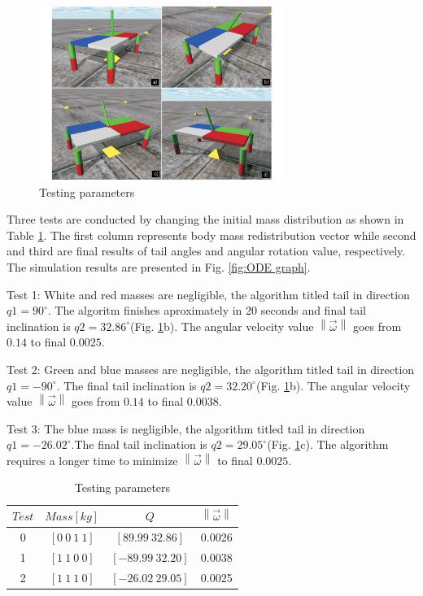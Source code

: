 \begin{figure}
	\centering
	\includegraphics[width=80mm]{./pictures/ODE_simulations.pdf}
	\caption{Testing parameters}
	\label{fig:ODESimulations}
\end{figure}

Three tests are conducted by changing the initial mass distribution as shown in Table \ref{tab:Simulations}. The first column represents body mass redistribution vector while second and third are final results of tail angles and angular rotation value, respectively. The simulation results are presented in Fig. \ref{fig:ODE graph}. 

Test 1: White and red masses are negligible, the algorithm titled tail in direction $q1=90^{\circ}$. The algoritm finishes aproximately in 20 seconds and final tail inclination is $q2=32.86^{\circ}$(Fig. \ref{fig:ODESimulations}b). The angular velocity value $\left \| \vec{\omega} \right \|$ goes from $0.14$ to final $0.0025$.

Test 2: Green and blue masses are negligible, the algorithm titled tail in direction $q1=-90^{\circ}$. The final tail inclination is $q2=32.20^{\circ}$(Fig. \ref{fig:ODESimulations}b). The angular velocity value $\left \| \vec{\omega} \right \|$ goes from $0.14$ to final $0.0038$. 

Test 3: The blue mass is negligible, the algorithm titled tail in direction $q1=-26.02^{\circ}$.The final tail inclination is $q2=29.05^{\circ}$(Fig. \ref{fig:ODESimulations}c). The algorithm requires a longer time to minimize $\left \| \vec{\omega} \right \|$ to final $0.0025$.

\begin{table}
	\centering
\begin{tabular}{|c|ccc|}
	\hline
$Test$ &  $Mass[kg]$ & $Q$  & $\left \| \vec{\omega} \right \|$\\
	\hline
0   & $[0\: 0\: 1\: 1]$ & $[89.99\: 32.86]$ & 0.0026\\
1   & $[1\: 1\: 0\: 0]$ & $[-89.99\: 32.20]$ & 0.0038\\
2   & $[1\: 1\: 1\: 0]$ & $[-26.02\: 29.05]$ &  0.0025\\
\hline
\end{tabular}
\caption{Testing parameters}\label{tab:Simulations}
\end{table}



